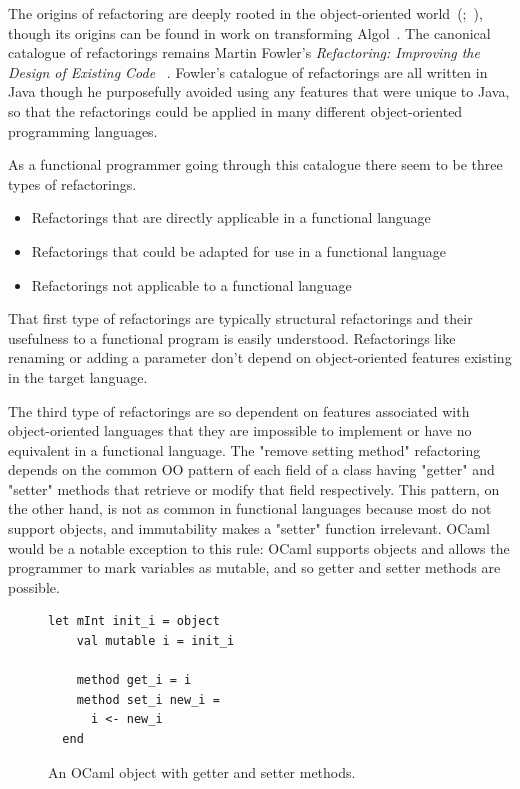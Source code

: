 The origins of refactoring are deeply rooted in the object-oriented world~(\cite{programRestructuring};~\cite{refactOOFrameworks}), though its origins can be found in work on transforming Algol~\citep{recursiveTransformation}. The canonical catalogue of refactorings remains Martin Fowler's \emph{Refactoring: Improving the Design of Existing Code} ~\citep{fowler}. Fowler's catalogue of refactorings are all written in Java though he purposefully avoided using any features that were unique to Java, so that the refactorings could be applied in many different object-oriented programming languages.

As a functional programmer going through this catalogue there seem to be three types of refactorings.

\begin{itemize}
	\item Refactorings that are directly applicable in a functional language
	\item Refactorings that could be adapted for use in a functional language
	\item Refactorings not applicable to a functional language
\end{itemize}

That first type of refactorings are typically structural refactorings and their usefulness to a functional program is easily understood. Refactorings like renaming or adding a parameter don't depend on object-oriented features existing in the target language.

The third type of refactorings are so dependent on features associated with object-oriented languages that they are impossible to implement or have no equivalent in a functional language. The "remove setting method" refactoring depends on the common OO pattern of each field of a class having "getter" and "setter" methods that retrieve or modify that field respectively. This pattern, on the other hand, is not as common in functional languages because most do not support objects, and immutability makes a "setter" function irrelevant. OCaml would be a notable exception to this rule: OCaml supports objects and allows the programmer to mark variables as mutable, and so getter and setter methods are possible.

\begin{figure}[t]
\begin{lstlisting}[language=caml, morekeywords={object,method}]
let mInt init_i = object
    val mutable i = init_i

    method get_i = i
    method set_i new_i =
      i <- new_i
  end
\end{lstlisting}
\caption{An OCaml object with getter and setter methods.}
\label{ocamlObj}
\end{figure}

